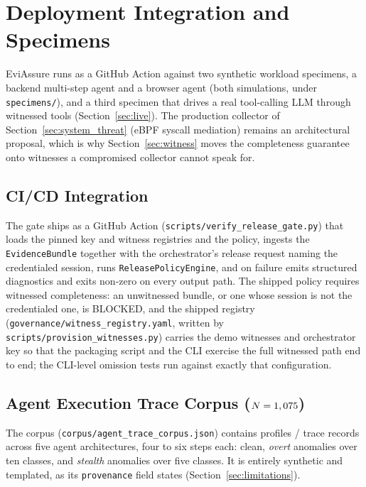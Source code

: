 \documentclass[letterpaper,10pt,twocolumn]{article}
\theoremstyle{definition}
\begin{document}
\section{Deployment Integration and Specimens}
EviAssure runs as a GitHub Action against two synthetic workload specimens, a backend multi-step agent and a browser agent (both simulations, under \nolinkurl{specimens/}), and a third specimen that drives a real tool-calling LLM through witnessed tools (Section~\ref{sec:live}). The production collector of Section~\ref{sec:system_threat} (eBPF syscall mediation) remains an architectural proposal, which is why Section~\ref{sec:witness} moves the completeness guarantee onto witnesses a compromised collector cannot speak for.

\subsection{CI/CD Integration}
The gate ships as a GitHub Action (\nolinkurl{scripts/verify_release_gate.py}) that loads the pinned key and witness registries and the policy, ingests the \texttt{EvidenceBundle} together with the orchestrator's release request naming the credentialed session, runs \texttt{ReleasePolicyEngine}, and on failure emits structured diagnostics and exits non-zero on every output path. The shipped policy requires witnessed completeness: an unwitnessed bundle, or one whose session is not the credentialed one, is BLOCKED, and the shipped registry (\nolinkurl{governance/witness_registry.yaml}, written by \nolinkurl{scripts/provision_witnesses.py}) carries the demo witnesses and orchestrator key so that the packaging script and the CLI exercise the full witnessed path end to end; the CLI-level omission tests run against exactly that configuration.

\subsection{Agent Execution Trace Corpus (\texorpdfstring{$N=1,075$}{N=1,075})}\label{sec:corpus}
The corpus (\nolinkurl{corpus/agent_trace_corpus.json}) contains \corpusProfiles{} profiles / \corpusRecords{} trace records across five agent architectures, four to six steps each: \corpusClean{} clean, \corpusOvert{} \emph{overt} anomalies over ten classes, and \corpusStealth{} \emph{stealth} anomalies over five classes. It is entirely synthetic and templated, as its \texttt{provenance} field states (Section~\ref{sec:limitations}).
\end{document}
